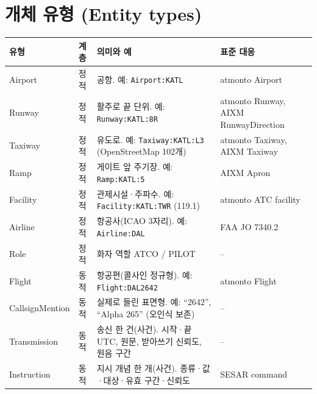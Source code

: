 \documentclass[10pt,a4paper]{article}
\newcommand{\cmd}[1]{\textsf{\small #1}}
\begin{document}
\section{개체 유형 (Entity types)}
\begin{center}\small
\begin{tabularx}{\textwidth}{@{}l l >{\raggedright\arraybackslash}X >{\raggedright\arraybackslash}p{3.4cm}@{}}
\toprule
유형 & 계층 & 의미와 예 & 표준 대응\\\midrule
\cmd{Airport} & 정적 & 공항. 예: \texttt{Airport:KATL} & atmonto Airport\\
\cmd{Runway} & 정적 & 활주로 끝 단위. 예: \texttt{Runway:KATL:8R} & atmonto Runway, AIXM RunwayDirection\\
\cmd{Taxiway} & 정적 & 유도로. 예: \texttt{Taxiway:KATL:L3} (OpenStreetMap 102개) & atmonto Taxiway, AIXM Taxiway\\
\cmd{Ramp} & 정적 & 게이트 앞 주기장. 예: \texttt{Ramp:KATL:5} & AIXM Apron\\
\cmd{Facility} & 정적 & 관제시설·주파수. 예: \texttt{Facility:KATL:TWR} (119.1) & atmonto ATC facility\\
\cmd{Airline} & 정적 & 항공사(ICAO 3자리). 예: \texttt{Airline:DAL} & FAA JO 7340.2 \cite{faa7340}\\
\cmd{Role} & 정적 & 화자 역할 \cmd{ATCO} / \cmd{PILOT} & --\\
\cmd{Flight} & 동적 & 항공편(콜사인 정규형). 예: \texttt{Flight:DAL2642} & atmonto Flight\\
\cmd{CallsignMention} & 동적 & 실제로 들린 표면형. 예: ``2642'', ``Alpha 265'' (오인식 보존) & --\\
\cmd{Transmission} & 동적 & 송신 한 건(사건). 시작·끝 UTC, 원문, 받아쓰기 신뢰도, 원음 구간 & --\\
\cmd{Instruction} & 동적 & 지시 개념 한 개(사건). 종류·값·대상·유효 구간·신뢰도 & SESAR command\\
\bottomrule
\end{tabularx}
\end{center}

\end{document}
